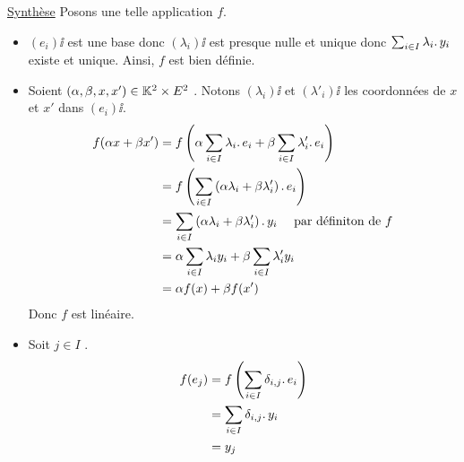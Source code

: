 \documentclass{article}
\begin{document}
\begin{question_kholle}
	\noindent \underline{Synthèse} Posons une telle application $f$. \\
	\begin{itemize}
		\item $(e_i)\ii$ est une base donc $(\lambda_i)\ii$ est presque nulle et unique donc $\sum_{i \in I} \lambda_i \ldotp y_i$ existe et unique.
		      Ainsi, $f$ est bien définie.
		\item Soient $(\alpha, \beta, x, x') \in \mathbb K^2 \times E^2$ \fqs. Notons $(\lambda_i)\ii$ et $(\lambda'_i)\ii$ les coordonnées de $x$ et $x'$ dans $(e_i)\ii$.
		      \begin{equation*}
			      \begin{aligned}
				      f( \alpha x + \beta x' )
				       & = f\left( \alpha \sum_{i \in I} \lambda_i \ldotp e_i + \beta \sum_{i \in I} \lambda'_i \ldotp e_i \right)               \\
				       & = f\left( \sum_{i \in I} \left( \alpha \lambda_i + \beta \lambda'_i \right) \ldotp e_i \right)                   \\
				       & = \sum_{i \in I} \left( \alpha \lambda_i + \beta \lambda'_i \right) \ldotp y_i \quad \text{ par définiton de } f \\
				       & = \alpha \sum_{i \in I} \lambda_i y_i + \beta \sum_{i \in I} \lambda'_i y_i                                             \\
				       & = \alpha f(x) + \beta f(x')
			      \end{aligned}
		      \end{equation*}
		      Donc $f$ est linéaire.
		\item Soit $j \in I$ \fq.
		      \begin{equation*}
			      \begin{aligned}
				      f(e_j)
				       & = f \left(\sum_{i \in I} \delta_{i,j} \ldotp e_i \right) \\
				       & = \sum_{i \in I} \delta_{i,j} \ldotp y_i                 \\
				       & = y_j
			      \end{aligned}
		      \end{equation*}
	\end{itemize}
\end{question_kholle}
\end{document}
